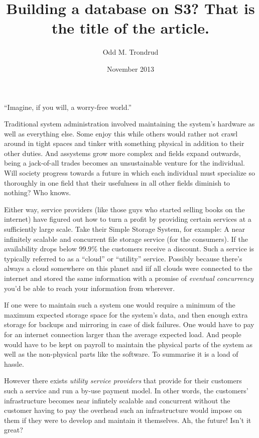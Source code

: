 \documentclass[11pt]{article}
\title{Building a database on S3? That is the title of the article.}
\author{Odd M. Trondrud}
\date{November 2013} %
\begin{document}
\maketitle


``Imagine, if you will, a worry-free world.''

Traditional system administration involved maintaining the system's hardware as well as everything else.
Some enjoy this while others would rather not crawl around in tight spaces and tinker with something physical in addition to their other duties.
And assystems grow more complex and fields expand outwards, being a jack-of-all trades becomes an unsustainable venture for the individual.
Will society progress towards a future in which each individual must specialize so thoroughly in one field that their usefulness in all other fields diminish to nothing?
Who knows.

Either way, service providers (like those guys who started selling books on the internet) have figured out how to turn a profit by providing certain services at a sufficiently large scale.
Take their Simple Storage System, for example:
A near infinitely scalable and concurrent file storage service (for the consumers).
If the availability drops below $99.9\%$ the customers receive a discount.
Such a service is typically referred to as a ``cloud'' or ``utility'' service.
Possibly because there's always a cloud somewhere on this planet and iif all clouds were connected to the internet and stored the same information with a promise of \textit{eventual concurrency} you'd be able to reach your information from wherever.

If one were to maintain such a system one would require a minimum of the maximum expected storage space for the system's data, and then enough extra storage for backups and mirroring in case of disk failures.
One would have to pay for an internet connection larger than the average expected load.
And people would have to be kept on payroll to maintain the physical parts of the system as well as the non-physical parts like the software.
To summarise it is a load of hassle.

However there exists \textit{utility service providers} that provide for their customers such a service and run a by-use payment model.
In other words, the customers' infrastructure becomes near infintely scalable and concurrent without the customer having to pay the overhead such an infrastructure would impose on them if they were to develop and maintain it themselves.
Ah, the future! Isn't it great?
\end{document}
